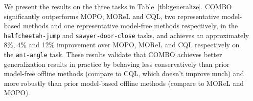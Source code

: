 We present the results on the three tasks in Table~\ref{tbl:generalize}. {COMBO significantly outperforms MOPO, MOReL and CQL, two representative model-based methods and one representative model-free methods respectively}, in the \texttt{halfcheetah-jump} and \texttt{sawyer-door-close} tasks, and {achieves an approximately 8\%, 4\% and 12\% improvement over MOPO, MOReL and CQL respectively on the \texttt{ant-angle} task}. {These results validate that COMBO achieves better generalization results in practice by behaving less conservatively than prior model-free offline methods (compare to CQL, which doesn't improve much) and more robustly than prior model-based offline methods (compare to MOReL and MOPO).}



